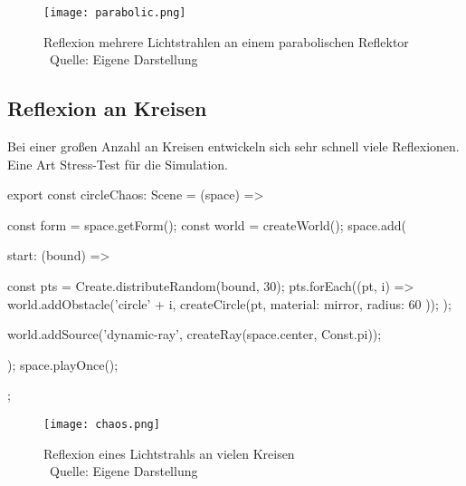\begin{figure}
    \centering
    \texttt{[image: parabolic.png]}

    \caption{Reflexion mehrere Lichtstrahlen an einem parabolischen Reflektor  \\ Quelle: Eigene Darstellung}

\end{figure}
\newpage

\subsection*{Reflexion an Kreisen}
Bei einer großen Anzahl an Kreisen entwickeln sich sehr schnell viele Reflexionen. Eine Art Stress-Test für die Simulation.
\begin{verbnobox}[\scriptsize\mbox{}]
export const circleChaos: Scene = (space) => {
    const form = space.getForm();
    const world = createWorld();
    space.add({
        start: (bound) => {
            const pts = Create.distributeRandom(bound, 30);
            pts.forEach((pt, i) => {
                world.addObstacle('circle' + i, createCircle(pt, { material: mirror, radius: 60 }));
            });

            world.addSource('dynamic-ray', createRay(space.center, Const.pi));
        }
    });
    space.playOnce();
};
\end{verbnobox}

\begin{figure}
    \centering
    \texttt{[image: chaos.png]}

    \caption{Reflexion eines Lichtstrahls an vielen Kreisen \\ Quelle: Eigene Darstellung}

\end{figure}